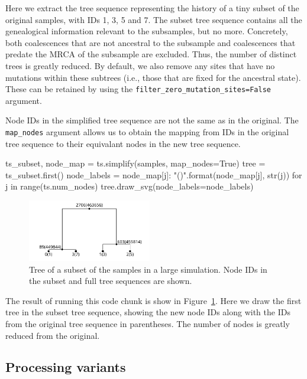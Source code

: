 \documentclass[graybox]{svmult}
\begin{document}
Here we extract the tree sequence representing the history of a tiny
subset of the original samples, with IDs 1, 3, 5 and 7. The subset tree
sequence contains all the genealogical information relevant to the
subsamples, but no more. Concretely, both coalescences that are not ancestral to the
subsample and coalescences that predate
the MRCA of the subsample are excluded. Thus, the number of distinct trees is greatly
reduced. By default, we also remove any sites that have no mutations
within these subtrees (i.e., those that are fixed for the ancestral
state). These can be retained by using the
\texttt{filter\_zero\_mutation\_sites=False} argument.

Node IDs in the simplified tree sequence are not the same as in the
original. The \texttt{map\_nodes} argument allows us to obtain the
mapping from IDs in the original tree sequence to their equivalant nodes
in the new tree sequence.

\begin{pythoncode}
ts_subset, node_map = ts.simplify(samples, map_nodes=True)
tree = ts_subset.first()
node_labels = {
    node_map[j]: "{}({})".format(node_map[j], str(j))
    for j in range(ts.num_nodes)}
tree.draw_svg(node_labels=node_labels)
\end{pythoncode}

\begin{figure}[t]
\centering
\includegraphics[width=0.48\textwidth]{images/plot_13.pdf}
\caption{\label{fig-tree-subset} Tree of a subset of the samples in a large
simulation. Node IDs in the subset and full tree sequences are shown.}
\end{figure}

The result of running this code chunk is show in Figure~\ref{fig-tree-subset}.
Here we draw the first tree in the subset tree sequence, showing the new
node IDs along with the IDs from the original tree sequence in
parentheses. The number of nodes is greatly reduced from the original.

\subsection{Processing variants}\label{processing-variants}
\end{document}
